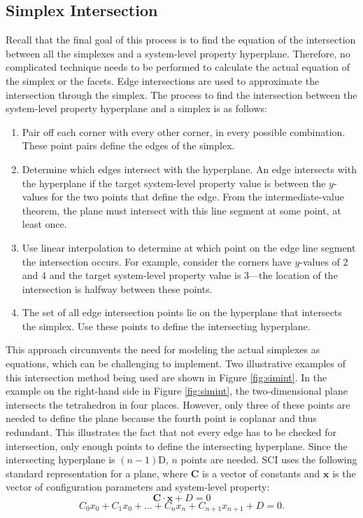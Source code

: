 \subsection{Simplex Intersection}
Recall that the final goal of this process is to find the equation of the intersection between all the simplexes and a system-level property hyperplane.
Therefore, no complicated technique needs to be performed to calculate the actual equation of the simplex or the facets.
Edge intersections are used to approximate the intersection through the simplex.
The process to find the intersection between the system-level property hyperplane and a simplex is as follows:
\begin{enumerate}
   \item Pair off each corner with every other corner, in every possible combination. These point pairs define the edges of the simplex.
   \item Determine which edges intersect with the hyperplane. An edge intersects with the hyperplane if the target system-level property value  is between the $y$-values for the two points that define the edge. From the intermediate-value theorem, the plane must intersect with this line segment at some point, at least once.
   \item Use linear interpolation to determine at which point on the edge line segment the intersection occurs. For example, consider the corners have $y$-values of 2 and 4 and the target system-level property value is 3---the location of the intersection is halfway between these points.
   \item The set of all edge intersection points lie on the hyperplane that intersects the simplex. Use these points to define the intersecting hyperplane.
\end{enumerate}
This approach circumvents the need for modeling the actual simplexes as equations, which can be challenging to implement.
Two illustrative examples of this intersection method being used are shown in Figure \ref{fig:simint}.
In the example on the right-hand side in Figure \ref{fig:simint}, the two-dimensional plane intersects the tetrahedron in four places.
However, only three of these points are needed to define the plane because the fourth point is coplanar and thus redundant.
This illustrates the fact that not every edge has to be checked for intersection, only enough points to define the intersecting hyperplane.
Since the intersecting hyperplane is $(n-1)$D, $n$ points are needed.
SCI uses the following standard representation for a plane, where $\mathbf C$ is a vector of constants and $\mathbf x$ is the vector of configuration parameters and system-level property:
\[\mathbf C \cdot \mathbf x + D = 0\]
\[C_0 x_0 + C_1 x_0 + ... + C_n x_n + C_{n+1} x_{n+1} + D = 0. \]

